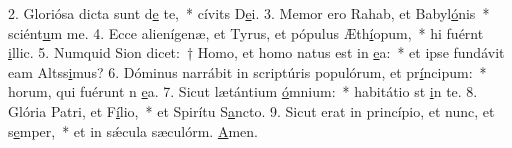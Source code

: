 2. Gloriósa dicta sunt d\uline{e} te,~* cívits D\uline{e}i.
3. Memor ero Rahab, et Babyl\uline{ó}nis~* sciént\uline{u}m me.
4. Ecce alienígenæ, et Tyrus, et pópulus Æth\uline{í}opum,~* hi fuérnt \uline{i}llic.
5. Numquid Sion dicet:~† Homo, et homo natus est in \uline{e}a:~* et ipse fundávit eam Altss\uline{i}mus?
6. Dóminus narrábit in scriptúris populórum, et pr\uline{í}ncipum:~* horum, qui fuérunt n \uline{e}a.
7. Sicut lætántium \uline{ó}mnium:~* habitátio st \uline{i}n te.
8. Glória Patri, et F\uline{í}lio,~* et Spirítu S\uline{a}ncto.
9. Sicut erat in princípio, et nunc, et s\uline{e}mper,~* et in sǽcula sæculórm. \uline{A}men.
